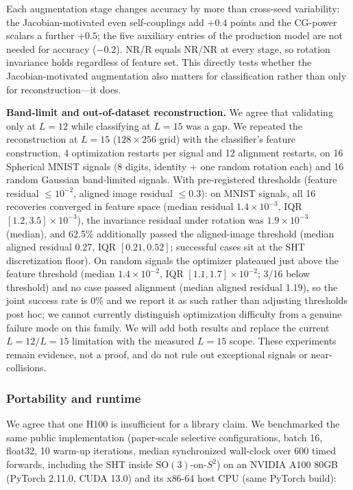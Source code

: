 \documentclass[10pt]{article}
\begin{document}
Each augmentation stage changes accuracy by more than cross-seed variability:
the Jacobian-motivated even self-couplings add $+0.4$ points and the CG-power
scalars a further $+0.5$; the five auxiliary entries of the production model
are not needed for accuracy ($-0.2$). NR/R equals NR/NR at every stage, so
rotation invariance holds regardless of feature set. This directly tests
whether the Jacobian-motivated augmentation also matters for classification
rather than only for reconstruction---it does.

\textbf{Band-limit and out-of-dataset reconstruction.} We agree that
validating only at $L=12$ while classifying at $L=15$ was a gap. We repeated
the reconstruction at $L=15$ ($128\times256$ grid) with the classifier's
feature construction, 4 optimization restarts per signal and 12 alignment
restarts, on 16 Spherical MNIST signals (8 digits, identity + one random
rotation each) and 16 random Gaussian band-limited signals. With
pre-registered thresholds (feature residual $\le 10^{-2}$, aligned image
residual $\le 0.3$): on MNIST signals, all 16 recoveries converged in feature
space (median residual $1.4\times10^{-3}$, IQR $[1.2, 3.5]\times10^{-3}$),
the invariance residual under rotation was $1.9\times10^{-3}$ (median), and
62.5\% additionally passed the aligned-image threshold (median aligned
residual 0.27, IQR $[0.21, 0.52]$; successful cases sit at the SHT
discretization floor). On random signals the optimizer plateaued just above
the feature threshold (median $1.4\times10^{-2}$, IQR
$[1.1, 1.7]\times10^{-2}$; 3/16 below threshold) and no case passed alignment
(median aligned residual 1.19), so the joint success rate is 0\% and we
report it as such rather than adjusting thresholds post hoc; we cannot
currently distinguish optimization difficulty from a genuine failure mode on
this family. We will add both results and replace the current $L=12/L=15$
limitation with the measured $L=15$ scope. These experiments remain evidence,
not a proof, and do not rule out exceptional signals or near-collisions.

\subsubsection*{Portability and runtime}

We agree that one H100 is insufficient for a library claim. We benchmarked
the same public implementation (paper-scale selective configurations, batch
16, float32, 10 warm-up iterations, median synchronized wall-clock over 600
timed forwards, including the SHT inside $\mathrm{SO}(3)$-on-$S^2$) on an
NVIDIA A100 80GB (PyTorch 2.11.0, CUDA 13.0) and its x86-64 host CPU (same
PyTorch build):
\end{document}
